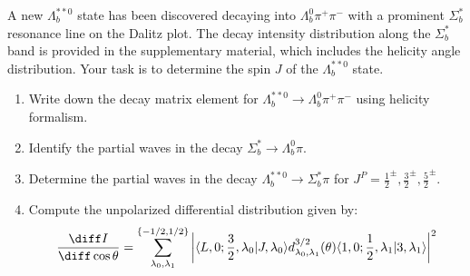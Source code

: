 A new $\Lambda_b^{**0}$ state has been discovered decaying into $\Lambda_b^0 \pi^+ \pi^-$ with a prominent $\Sigma_b^*$ resonance line on the Dalitz plot. The decay intensity distribution along the $\Sigma_b^*$ band is provided in the supplementary material, which includes the helicity angle distribution. Your task is to determine the spin $J$ of the $\Lambda_b^{**0}$ state.

\begin{enumerate}
    \item Write down the decay matrix element for $\Lambda_b^{**0} \to \Lambda_b^0 \pi^+ \pi^-$ using helicity formalism.
    \item Identify the partial waves in the decay $\Sigma_b^* \to \Lambda_b^0 \pi$.
    \item Determine the partial waves in the decay $\Lambda_b^{**0} \to \Sigma_b^* \pi$ for $J^P = \frac{1}{2}^\pm, \frac{3}{2}^\pm, \frac{5}{2}^\pm$.
    \item Compute the unpolarized differential distribution given by:
          $$
              \frac{\diff I}{\diff \cos \theta} = \sum_{\lambda_0, \lambda_1}^{\{-1/2,1/2\}} \left| \langle L, 0; \frac{3}{2}, \lambda_0 | J, \lambda_0 \rangle d^{3/2}_{\lambda_0, \lambda_1}(\theta) \langle 1, 0; \frac{1}{2}, \lambda_1 | 3, \lambda_1 \rangle \right|^2
          $$
\end{enumerate}
